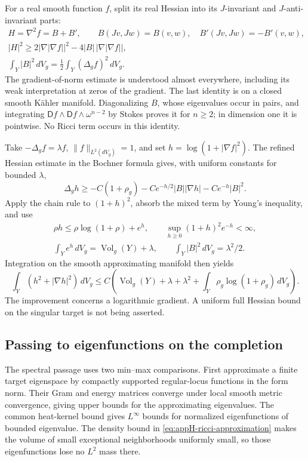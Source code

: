 For a real smooth function \(f\), split its real Hessian into
its \(J\)-invariant and \(J\)-anti-invariant parts:
\[
 \begin{gathered}
 H=\nabla^2f=B+B',\qquad
 B(Jv,Jw)=B(v,w),\quad B'(Jv,Jw)=-B'(v,w),\\
 |H|^2\geq
     2|\nabla|\nabla f||^2-4|B|\,|\nabla|\nabla f||,\\
 \int_Y|B|^2\,dV_g
       =\frac12\int_Y(\Delta_gf)^2\,dV_g.
 \end{gathered}
 \tag{H.160}\label{eq:appH-ricci-hessian-gain}
\]
The gradient-of-norm estimate is understood almost everywhere,
including its weak interpretation at zeros of the gradient.
The last identity is on a closed smooth Kähler manifold.
Diagonalizing \(B\), whose eigenvalues occur in pairs, and
integrating
\(\mathsf Df\wedge\mathsf Df\wedge\omega^{n-2}\)
by Stokes proves it for \(n\geq2\); in dimension one it is
pointwise. No Ricci term occurs in this identity.

Take \(-\Delta_gf=\lambda f\), \(\|f\|_{L^2(dV_g)}=1\), and set
\(h=\log(1+|\nabla f|^2)\). The refined Hessian estimate in the
Bochner formula gives, with uniform constants for bounded
\(\lambda\),
\[
 \Delta_gh\geq
  -C(1+\rho_g)
  -Ce^{-h/2}|B||\nabla h|-Ce^{-h}|B|^2.
 \tag{H.161}\label{eq:appH-ricci-log-gradient}
\]
Apply the chain rule to \((1+h)^2\), absorb the mixed term
by Young's inequality, and use
\[
 \begin{gathered}
 \rho h\leq\rho\log(1+\rho)+e^h,\qquad
 \sup_{h\geq0}(1+h)^2e^{-h}<\infty,\\
 \int_Ye^h\,dV_g=\operatorname{Vol}_g(Y)+\lambda,\qquad
 \int_Y|B|^2\,dV_g=\lambda^2/2.
 \end{gathered}
\]
Integration on the smooth approximating manifold then yields
\[
 \int_Y(h^2+|\nabla h|^2)\,dV_g
 \leq C\left(\operatorname{Vol}_g(Y)+\lambda+\lambda^2+
              \int_Y\rho_g\log(1+\rho_g)\,dV_g\right).
 \tag{H.162}\label{eq:appH-ricci-log-energy}
\]
The improvement concerns a logarithmic gradient. A uniform
full Hessian bound on the singular target is not being asserted.

\subsection{Passing to eigenfunctions on the completion}

The spectral passage uses two min--max comparisons. First
approximate a finite target eigenspace by compactly supported
regular-locus functions in the form norm. Their Gram and
energy matrices converge under local smooth metric convergence,
giving upper bounds for the approximating eigenvalues.
The common heat-kernel bound gives \(L^\infty\) bounds for
normalized eigenfunctions of bounded eigenvalue. The density
bound in \eqref{eq:appH-ricci-approximation} makes the volume of
small exceptional neighborhoods uniformly small, so those
eigenfunctions lose no \(L^2\) mass there.

